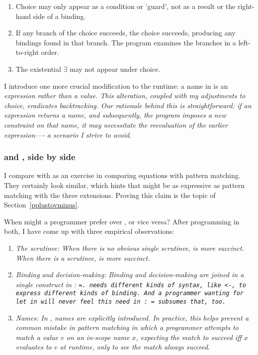 \documentclass[manuscript,screen,review, 12pt, nonacm]{acmart}
\begin{document}
\begin{enumerate}
\item Choice may only appear as a condition or 'guard', not as a result
or the right-hand side of a binding.
\item If any branch of the choice succeeds, the choice succeeds,
producing any bindings found in that branch. The program examines the
branches in a left-to-right order.
\item The existential $\exists$ may not appear under choice.
\end{enumerate}

I introduce one more crucial modification to the \VC runtime: a name in
\VMinus is an \it{expression} rather than a \it{value}. This alteration,
coupled with my adjustments to choice, eradicates backtracking. Our
rationale behind this is straightforward: if an expression returns a
name, and subsequently, the program imposes a new constraint on that
name, it may necessitate the reevaluation of the earlier expression—- a
scenario I strive to avoid. 

\subsubsection{\VMinus and \PPlus, side by side}
I compare \VMinus with \PPlus as an exercise in comparing equations with
pattern matching. They certainly look similar, which hints that \VMinus
might be as expressive as pattern matching with the three extensions. 
Proving this claim is the topic of Section~\ref{pplustovminus}. 

When might a programmer prefer \VMinus over \PPlus, or vice versa? After
programming in both, I have come up with three empirical observations: 

\begin{enumerate}
  \item \it{The scrutinee:} When there is no obvious single scrutinee, \VMinus is more succinct.
  When there is a scrutinee, \PPlus is more succinct. 
  \item \it{Binding and decision-making:} Binding and decision-making are
  joined in a single construct in \VMinus: \tt{=}. \PPlus needs different
  kinds of syntax, like \tt{<-}, to express different kinds of binding. And
  a programmer wanting for \tt{let} in \PPlus will never feel this need in
  \VMinus: \tt{=} subsumes that, too. 
  \item \it{Names:} In \VMinus, names are explicitly introduced. In
  practice, this helps prevent a common mistake in pattern matching in which
  a programmer attempts to match a value $v$ on an in-scope name $x$,
  expecting the match to succeed iff $x$ evaluates to $v$ at runtime, only
  to see the match always succeed. 
\end{enumerate}     
\end{document}
